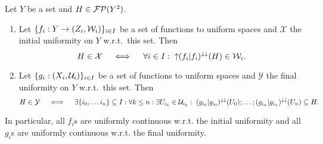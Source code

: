 \begin{proposition} \label{initialFinalUniformity}
Let $Y$ be a set and $H\in\operatorname{\mathcal{FP}}(Y^2)$.
\begin{enumerate}
\item Let $\{f_i: Y\to \left( Z_i, \mathcal{W}_i \right)\}_{i\in I}$ be a set of functions to uniform spaces and $\mathcal{X}$ the initial uniformity on $Y$ w.r.t.\ this set. Then
\[ H\in \mathcal{X} \quad\iff\quad \forall i\in I: \; \operatorname{\uparrow}(f_i|f_i)^{\downarrow\downarrow}(H)\in \mathcal{W}_i. \]
\item Let $\{g_i: \left( X_i, \mathcal{U}_i \right)\}_{i\in I}$ be a set of functions to uniform spaces and $\mathcal{Y}$ the final uniformity on $Y$ w.r.t.\ this set. Then
\[ H\in \mathcal{Y} \quad\iff\quad \exists \{i_0,\ldots i_n\}\subseteq I: \forall k\leq n: \exists U_{i_k}\in \mathcal{U}_{i_k}:\; (g_{i_0}|g_{i_0})^{\downarrow\downarrow}(U_0);\ldots;(g_{i_n}|g_{i_n})^{\downarrow\downarrow}(U_n)\subseteq H. \]
\end{enumerate}
\end{proposition}
In particular, all $f_i$s are uniformly continuous w.r.t. the initial uniformity and all $g_i$s are uniformly continuous w.r.t. the final uniformity.

